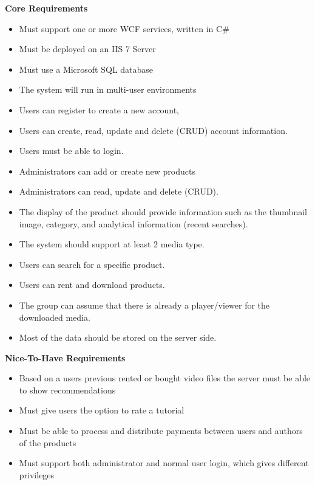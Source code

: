 \textbf{Core Requirements}
\begin{itemize}
	\item Must support one or more WCF services, written in C\#
	\item Must be deployed on an IIS 7 Server
	\item Must use a Microsoft SQL database
	\item The system will run in multi-user environments
	\item Users can register to create a new account, 
	\item Users can create, read, update and delete (CRUD) account information.
	\item Users must be able to login.
	\item Administrators can add or create new products
	\item Administrators can read, update and delete (CRUD). 		 
	\item The display of the product should provide information such as the thumbnail image, category, and 						analytical information (recent searches). 
	\item The system should support at least 2 media type.
	
	\item Users can search for a specific product.
	\item Users can rent and download products.
	\item The group can assume that there is already a player/viewer for the downloaded media.
	\item Most of the data should be stored on the server side.
\end{itemize}
\textbf{Nice-To-Have Requirements}
\begin{itemize}
	\item Based on a users previous rented or bought video files the server must be able to show recommendations
	\item Must give users the option to rate a tutorial
	\item Must be able to process and distribute payments between users and authors of the products
	\item Must support both administrator and normal user login, which gives different privileges
\end{itemize}

